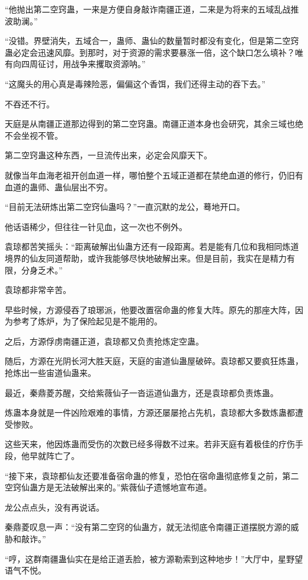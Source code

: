 \begin{this_body}
“他抛出第二空窍蛊，一来是方便自身敲诈南疆正道，二来是为将来的五域乱战推波助澜。”

“没错。界壁消失，五域合一，蛊师、蛊仙的数量暂时都没有变化，但是第二空窍蛊必定会迅速风靡。到那时，对于资源的需求要暴涨一倍，这个缺口怎么填补？唯有向四周征讨，用战争来攫取资源呐。”

“这魔头的用心真是毒辣险恶，偏偏这个香饵，我们还得主动的吞下去。”

不吞还不行。

天庭是从南疆正道那边得到的第二空窍蛊。南疆正道本身也会研究，其余三域也绝不会坐视不管。

第二空窍蛊这种东西，一旦流传出来，必定会风靡天下。

就像当年血海老祖开创血道一样，哪怕整个五域正道都在禁绝血道的修行，仍旧有血道的蛊师、蛊仙层出不穷。

“目前无法研炼出第二空窍仙蛊吗？”一直沉默的龙公，蓦地开口。

他话语稀少，但往往一针见血，这一次也不例外。

袁琼都苦笑摇头：“距离破解出仙蛊方还有一段距离。若是能有几位和我相同炼道境界的仙友同道帮助，或许我能够尽快地破解出来。但是目前，我实在是精力有限，分身乏术。”

袁琼都非常辛苦。

早些时候，方源侵吞了琅琊派，他要改置宿命蛊的修复大阵。原先的那座大阵，因为参考了炼炉，为了保险起见是不能用的。

之后，方源俘虏南疆正道，袁琼都又负责抢炼定空蛊。

随后，方源在光阴长河大胜天庭，天庭的宙道仙蛊屋破碎。袁琼都又要疯狂炼蛊，抢炼出一些宙道仙蛊来。

最近，秦鼎菱苏醒，交给紫薇仙子一沓运道仙蛊方，还是袁琼都负责炼蛊。

炼蛊本身就是一件凶险艰难的事情，方源还屡屡抢占先机，袁琼都大多数炼蛊都遭受惨败。

这些天来，他因炼蛊而受伤的次数已经多得数不过来。若非天庭有着极佳的疗伤手段，他早就阵亡了。

“接下来，袁琼都仙友还要准备宿命蛊的修复，恐怕在宿命蛊彻底修复之前，第二空窍仙蛊方是无法破解出来的。”紫薇仙子遗憾地宣布道。

龙公点点头，没有再说话。

秦鼎菱叹息一声：“没有第二空窍的仙蛊方，就无法彻底令南疆正道摆脱方源的威胁和敲诈。”

“哼，这群南疆蛊仙实在是给正道丢脸，被方源勒索到这种地步！”大厅中，星野望语气不悦。


\end{this_body}
